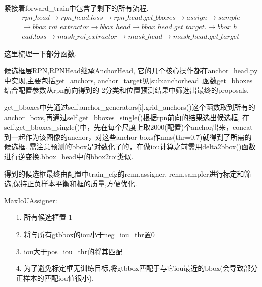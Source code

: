\documentclass[UTF8]{ctexart}
\begin{document}


紧接着forward\_train中包含了剩下的所有流程.
\begin{equation*}
	\begin{aligned}
		 rpn\_head \rightarrow rpn\_head.loss \rightarrow rpn\_head.get\_bboxes \rightarrow assign \rightarrow sample \\
		\rightarrow bbox\_roi\_extractor \rightarrow  bbox\_head \rightarrow bbox\_head.get\_target. \rightarrow bbox\_h\\
		ead.loss \rightarrow mask\_roi\_extractor \rightarrow mask\_head \rightarrow mask\_head.get\_target
	\end{aligned}
\end{equation*} 

这里梳理一下部分函数.

候选框层RPN,RPNHead继承AnchorHead, 它的几个核心操作都在anchor\_head.py中实现,主要包括get\_anchors, anchor\_target见\ref{sub:anchorhead},函数get\_bboxes结合配置参数从rpn前向得到的
2分类和位置预测结果中筛选出最终的proposals.

get\_bboxes中先通过self.anchor\_generators[i].grid\_anchors()这个函数取到所有的anchor\_boxs,再通过self.get\_bboxes\_single()根据rpn前向的结果选出候选框,
在self.get\_bboxes\_single()中，先在每个尺度上取2000(配置)个anchor出来，concat到一起作为该图像的anchor，对这些anchor boxs作nms(thr=0.7)就得到了所需的候选框.
需注意预测的bbox是对数化了的，在做iou计算之前需用delta2bbox()函数进行逆变换.bbox\_head中的bbox2roi类似.

得到的候选框最终由配置中train\_cfg的rcnn.assigner, rcnn.sampler进行标定和筛选,保持正负样本平衡和框的质量,方便优化.

MaxIoUAssigner:
\label{sub:MaxIoUAssigner}
\begin{adjustwidth}{1cm}{0cm}
\begin{itemize}
	\item[1.] 所有候选框置-1
	\item[2.] 将与所有gtbbox的iou小于neg\_iou\_thr置0
	\item[3.] iou大于pos\_iou\_thr的将其匹配
	\item[4.] 为了避免标定框无训练目标,将gtbbox匹配于与它iou最近的bbox(会导致部分正样本的匹配iou值很小).
\end{itemize}
\end{adjustwidth}
\end{document}
